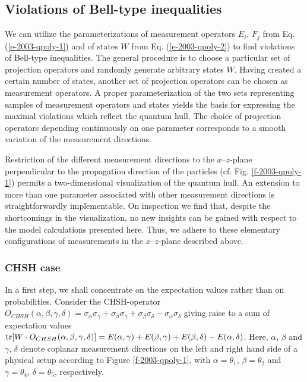 \subsection{Violations of Bell-type inequalities}
We can utilize  the parameterizations of measurement operators
$E_i,\,F_j$ from Eq. (\ref{e-2003-qpoly-1})
and of states $W$ from Eq. (\ref{e-2003-qpoly-2})
to find violations of Bell-type
inequalities.
The general procedure is to choose a particular set of
projection operators and randomly generate arbitrary states $W$.
Having created a certain number of states, another set of
projection operators can be chosen as measurement operators.
A proper parameterization of the two sets representing samples of
measurement operators and states yields the basis
for expressing the maximal violations which reflect the quantum hull.
The choice of projection operators depending continuously on one
parameter corresponds to a smooth variation of the measurement
directions.

Restriction of the different measurement
directions to the $x$--$z$-plane perpendicular to the propagation direction of the particles
(cf. Fig. \ref{f-2003-qpoly-1})
permits a two-dimensional visualization of
the quantum hull.
An extension to more than one parameter associated with other measurement
directions is straightforwardly implementable.
On inspection we find that, despite the shortcomings in the visualization, no new insights
can be gained with respect to the model calculations presented here.
Thus, we adhere to these elementary
configurations of measurements in the $x$--$z$-plane described above.


\subsubsection{CHSH case}
In a first step, we shall concentrate on the expectation values
rather than on probabilities.
Consider the CHSH-operator
$
  O_{CHSH}(\alpha ,\beta ,\gamma ,\delta )=
\sigma_\alpha \sigma_\gamma + \sigma_\beta \sigma_\gamma +
  \sigma_\beta \sigma_\delta - \sigma_\alpha \sigma_\delta
$ giving raise to a sum of expectation values
$
{\rm tr}[W\cdot O_{CHSH}(\alpha ,\beta ,\gamma ,\delta )]= E(\alpha,\gamma) +
  E(\beta,\gamma) + E(\beta,\delta) - E(\alpha,\delta)$.
Here, $\alpha$, $\beta$ and $\gamma$, $\delta$ denote coplanar measurement
directions on the left and right hand side of a physical setup according to
Figure \ref{f-2003-qpoly-1}, with $\alpha = \theta_1$, $\beta=\theta_2$ and
$\gamma=\theta_4$, $\delta=\theta_5$, respectively.


